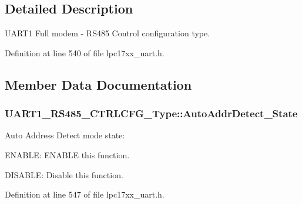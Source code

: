 \subsection{\-Detailed \-Description}
\-U\-A\-R\-T1 \-Full modem -\/ \-R\-S485 \-Control configuration type. 

\-Definition at line 540 of file lpc17xx\-\_\-uart.\-h.



\subsection{\-Member \-Data \-Documentation}
\hypertarget{struct_u_a_r_t1___r_s485___c_t_r_l_c_f_g___type_a93f18ca28cd7e67195e6d59c211a7709}{
\subsubsection[{\-Auto\-Addr\-Detect\-\_\-\-State}]{ {\bf \-U\-A\-R\-T1\-\_\-\-R\-S485\-\_\-\-C\-T\-R\-L\-C\-F\-G\-\_\-\-Type\-::\-Auto\-Addr\-Detect\-\_\-\-State}}}\label{struct_u_a_r_t1___r_s485___c_t_r_l_c_f_g___type_a93f18ca28cd7e67195e6d59c211a7709}
\-Auto \-Address \-Detect mode state\-:
\begin{DoxyItemize}
\item \-E\-N\-A\-B\-L\-E\-: \-E\-N\-A\-B\-L\-E this function.
\item \-D\-I\-S\-A\-B\-L\-E\-: \-Disable this function. 
\end{DoxyItemize}

\-Definition at line 547 of file lpc17xx\-\_\-uart.\-h.

